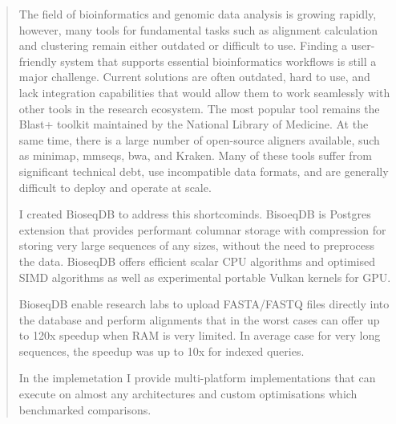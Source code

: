 \begin{abstract}
    \vfilneg
    \enlargethispage{4\baselineskip}
The field of bioinformatics and genomic data analysis is growing rapidly, however, many tools for fundamental tasks such as alignment calculation and clustering remain 
either outdated or difficult to use. Finding a user-friendly system that supports essential bioinformatics workflows is still a major challenge. 
Current solutions are often outdated, hard to use, and lack integration capabilities that would allow them to work seamlessly 
with other tools in the research ecosystem. 
The most popular tool remains the Blast+ toolkit maintained by the National Library of Medicine.
 At the same time, there is a large number of open-source aligners available, such as minimap, mmseqs, bwa, and Kraken. 
 Many of these tools suffer from significant technical debt, use incompatible data formats, and are generally difficult to deploy and operate at scale.

I created BioseqDB to address this shortcominds. BisoeqDB is Postgres extension that provides performant columnar storage with compression for storing very large sequences of any sizes, without the need to preprocess the data.
BioseqDB offers efficient scalar CPU algorithms and optimised SIMD algorithms as well as experimental portable Vulkan kernels for GPU.

BioseqDB enable research labs to upload FASTA/FASTQ files directly into the database and perform alignments that in the worst cases can offer up to 120x speedup when RAM is very limited.
In average case for very long sequences, the speedup was up to 10x for indexed queries.

In the implemetation I provide multi-platform implementations that can execute on almost any architectures and custom optimisations which benchmarked comparisons.
\end{abstract}

\makeatletter
\renewcommand*\l@section{\@dottedtocline{1}{1.5em}{3.0em}}
\renewcommand*\l@subsection{\@dottedtocline{2}{3.8em}{4.0em}}
\renewcommand*\l@subsubsection{\@dottedtocline{3}{7.0em}{5.0em}}
\makeatother
\tableofcontents

